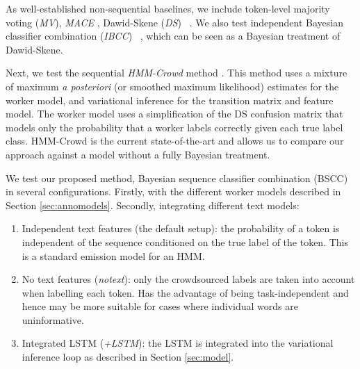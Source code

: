 As well-established non-sequential baselines, we include token-level majority voting (\emph{MV}), \emph{MACE} \cite{hovy2013learning}, Dawid-Skene (\emph{DS}) ~\cite{dawid_maximum_1979}.  We also test independent Bayesian classifier combination (\emph{IBCC}) ~\cite{kim2012bayesian}, which can be seen as a Bayesian treatment of Dawid-Skene. 

Next, we test the sequential \emph{HMM-Crowd} method \cite{nguyen2017aggregating}. This method uses a mixture of maximum \emph{a posteriori} (or smoothed maximum likelihood) estimates for the worker model, and variational inference for the transition matrix and feature model. The worker model uses a simplification of the DS confusion matrix that models only the probability that a worker labels correctly given each true label class. HMM-Crowd is the current state-of-the-art and allows us to compare our approach against a model without a fully Bayesian treatment. 

We test our proposed method, Bayesian sequence classifier combination (BSCC) in several configurations. Firstly, with the different worker models described in Section \ref{sec:annomodels}.
Secondly, integrating different text models:
\begin{enumerate}
\item Independent text features (the default setup): the probability of a token is independent of the sequence conditioned on the true label of the token. This is a standard emission model for an HMM.
\item No text features (\emph{notext}): only the crowdsourced labels are taken into account when labelling each token. Has the advantage of being task-independent and hence may be more suitable for cases where individual words are uninformative.
\item Integrated LSTM (\emph{+LSTM}): the LSTM is integrated into the variational inference loop as described in Section \ref{sec:model}.
\end{enumerate}


